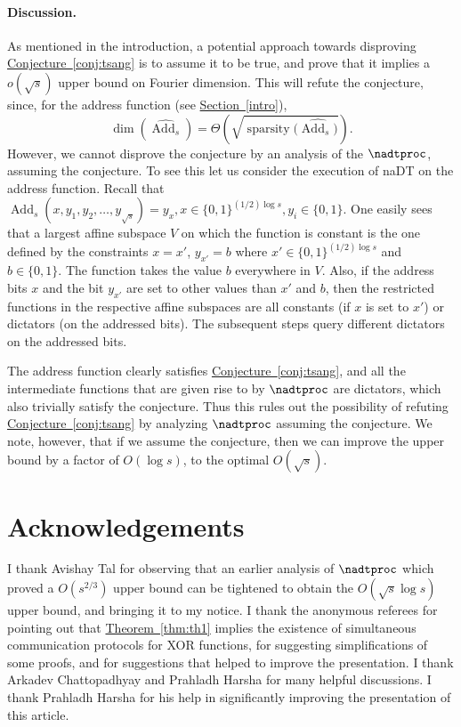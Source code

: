 \documentclass{toc}
\DeclareMathOperator{\spa}{sparsity}
\DeclareMathOperator{\dimn}{dim}
\DeclareMathOperator{\Add}{Add}   %
\newcommand{\lref}[2][]{\hyperref[#2]{#1~\ref*{#2}}}
\begin{document}
\paragraph{Discussion.}  %
As mentioned in the introduction, a potential approach towards disproving \lref[Conjecture]{conj:tsang} is to assume it to be true, and prove that it implies a $o(\sqrt{s})$ upper bound on Fourier dimension.
This will refute the conjecture, since, for the address function (see \lref[Section]{intro}),
\[
  \dimn(\widehat{\Add_s}) = \Theta\left(\sqrt{\spa(\widehat{\Add_s)}}\right).
\]
However, we cannot disprove the conjecture by an analysis of the
$\nadtproc$, assuming the conjecture. To see this let us consider the
execution of {\sc naDT} on the address function. Recall that
$\Add_s(x,y_1,y_2,\dots,y_{\sqrt{s}}) = y_x, x \in\{0,1\}^{(1/2)\log
  s}, y_i \in \{0,1\}$. One easily sees that a largest affine subspace
$V$ on which the function is constant is the one defined by the
constraints $x=x'$, $y_{x'}=b$ where
$x' \in \{0,1\}^{({1}/{2}) \log s}$ and $b \in \{0,1\}$. The
function takes the value $b$ everywhere in $V$. Also, if the
%
address     %
bits $x$ and the bit $y_{x'}$ are set to other values than $x'$ and $b$,
then the restricted functions in the respective affine subspaces are all
constants (if $x$ is set to $x'$) or dictators (on
%
the addressed  %
bits). The subsequent steps
%
query  %
different dictators on the
%
addressed   %
bits.

The address function clearly satisfies \lref[Conjecture]{conj:tsang}, and all the intermediate functions that are given rise to by $\nadtproc$ are dictators, which also trivially satisfy the conjecture.
Thus this rules out the possibility of refuting \lref[Conjecture]{conj:tsang} by analyzing $\nadtproc$ assuming the conjecture. We note, however, that if we assume the conjecture, then we
can improve the upper bound by a factor of $O(\log s)$, to the optimal $O(\sqrt{s})$.
\section*{Acknowledgements}
I thank Avishay Tal for observing that an earlier analysis of $\nadtproc$ which proved a $O(s^{2/3})$ upper bound can be tightened to obtain the $O(\sqrt{s} \log s)$ upper bound, and bringing it to my notice. I thank the anonymous referees for pointing out that \lref[Theorem]{thm:th1} implies
the  %
existence of simultaneous communication protocols for XOR functions, for suggesting simplifications of some proofs, and for suggestions that helped to %
improve the presentation. I thank Arkadev Chattopadhyay and Prahladh Harsha for many helpful discussions. I thank Prahladh Harsha for his help in
%
significantly improving the presentation of this article.  %
\end{document}
